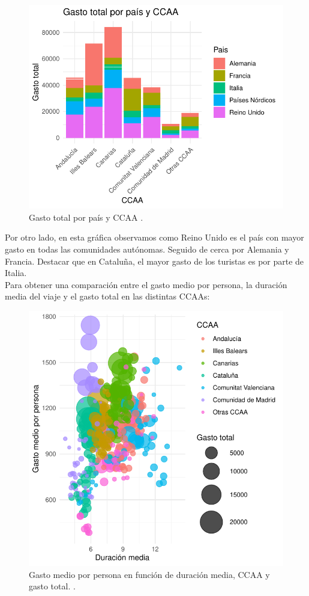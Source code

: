 \documentclass[data,article,submit,moreauthors,pdftex]{Definitions/mdpi}
\begin{document}
\begin{figure}[H]
\includegraphics{ProyectoAED2024_Rmd_files/figure-latex/unnamed-chunk-23-1} \caption{Gasto total por país y CCAA .\label{fig:GastototalporpaísyCCAA}}\label{fig:unnamed-chunk-23}
\end{figure}

Por otro lado, en esta gráfica observamos como Reino Unido es el país con mayor gasto en todas las comunidades autónomas. Seguido de cerca por Alemania y Francia. Destacar que en Cataluña, el mayor gasto de los turistas es por parte de Italia.\\

Para obtener una comparación entre el gasto medio por persona, la duración media del viaje y el gasto total en las distintas CCAAs:
\begin{figure}[H]
\includegraphics{ProyectoAED2024_Rmd_files/figure-latex/unnamed-chunk-24-1} \caption{Gasto medio por persona en función de duración media, CCAA y gasto total. .\label{fig:bubblegraph}}\label{fig:unnamed-chunk-24}
\end{figure}
\end{document}
